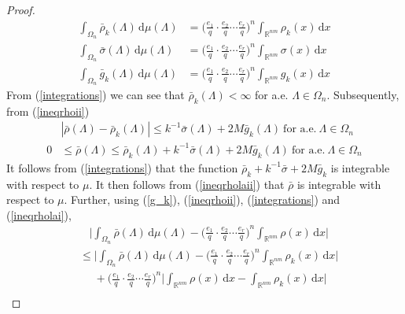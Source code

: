 \documentclass[11pt]{article}
\theoremstyle{definition}
\theoremstyle{proof}
\begin{document}
\begin{proof}
\begin{equation}
\begin{split}
            \int_{{\Omega}_n} \bar{\rho }_k (\Lambda ) \, \mathrm{d} \mu (\Lambda ) &= {\bigg(\frac{e_1}{q} \cdot \frac{e_2}{q} \cdots \frac{e_r}{q} \bigg)}^n \int_{\mathbb{R}^{nm}} \rho _k (x) \, \mathrm{d} x \\
            \int_{{\Omega}_n} \bar{\sigma }(\Lambda ) \, \mathrm{d} \mu (\Lambda ) &= {\bigg(\frac{e_1}{q} \cdot \frac{e_2}{q} \cdots \frac{e_r}{q} \bigg)}^n \int_{\mathbb{R}^{nm}} \sigma (x) \, \mathrm{d} x \\
            \int_{{\Omega}_n} \bar{g}_k (\Lambda ) \, \mathrm{d} \mu (\Lambda ) &= {\bigg(\frac{e_1}{q} \cdot \frac{e_2}{q} \cdots \frac{e_r}{q} \bigg)}^n \int_{\mathbb{R}^{nm}} g_k(x) \, \mathrm{d} x
        \end{split}
    \end{equation}
    From (\ref{integrations}) we can see that $\bar{\rho }_k(\Lambda ) < \infty$ for a.e. $\Lambda \in {\Omega}_n$.
    Subsequently, from (\ref{ineqrhoii})
    \begin{align}\label{ineqrholai}
        & |\bar{\rho } (\Lambda) - \bar{\rho }_k (\Lambda)| \leq k^{-1} \bar{\sigma }(\Lambda) + 2M \bar{g}_k(\Lambda) \ \text{for a.e.} \ \Lambda \in {\Omega}_n \\
        \label{ineqrholaii}
        0 & \leq \bar{\rho }(\Lambda ) \leq \bar{\rho }_k (\Lambda ) + k^{-1} \bar{\sigma }(\Lambda ) +2M \bar{g}_k (\Lambda ) \ \text{for a.e.} \ \Lambda \in {\Omega}_n
    \end{align}
    It follows from (\ref{integrations}) that the function $\bar{\rho }_k + k^{-1} \bar{\sigma }+2M \bar{g}_k $ is integrable with respect to $\mu$.
    It then follows from (\ref{ineqrholaii}) that $\bar{\rho }$ is integrable with respect to $\mu$.
    Further, using (\ref{g_k}), (\ref{ineqrhoii}), (\ref{integrations}) and (\ref{ineqrholai}),
    \begin{equation*}
        \begin{split}
            & \ \ \ \ \Bigg|\int_{{\Omega}_n} \bar{\rho }(\Lambda ) \, \mathrm{d} \mu (\Lambda ) - {\bigg(\frac{e_1}{q} \cdot \frac{e_2}{q} \cdots \frac{e_r}{q} \bigg)}^n \int_{\mathbb{R}^{nm}} \rho (x) \, \mathrm{d} x \Bigg| \\
            & \leq \Bigg|\int_{{\Omega}_n} \bar{\rho } (\Lambda ) \, \mathrm{d} \mu (\Lambda ) - {\bigg(\frac{e_1}{q} \cdot \frac{e_2}{q} \cdots \frac{e_r}{q} \bigg)}^n \int_{\mathbb{R}^{nm}} \rho _k (x) \, \mathrm{d} x \Bigg| \\
            & \ \ \ \ \ \ + {\bigg(\frac{e_1}{q} \cdot \frac{e_2}{q} \cdots \frac{e_r}{q} \bigg)}^n \Bigg|\int_{\mathbb{R}^{nm}} \rho (x) \, \mathrm{d} x - \int_{\mathbb{R}^{nm}} \rho _k (x) \, \mathrm{d} x \Bigg| \\

\end{split}
\end{equation*}
\end{proof}
\end{document}
